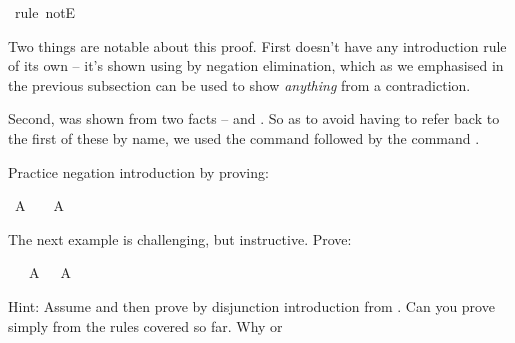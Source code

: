 \begin{isabellebody}
\ {\isacharparenleft}rule\ notE{\isacharparenright}\isanewline
{}\isamarkupfalse%
%
\endisatagproof
{\isafoldproof}%
%
\isadelimproof
%
\endisadelimproof
%
\begin{isamarkuptext}%
Two things are notable about this proof. First  doesn't have any introduction
rule of its own -- it's shown using by negation elimination, which as we emphasised in the previous
subsection can be used to show \emph{anything} from a contradiction.%
\end{isamarkuptext}\isamarkuptrue%
%
\begin{isamarkuptext}%
Second,  was shown from two facts --  and . So as to avoid
having to refer back to the first of these by name, we used the command  followed by
the command .%
\end{isamarkuptext}\isamarkuptrue%
%
\begin{isamarkuptext}%
\begin{Exercise}[label = doublenegationintroduction] 
Practice negation introduction by proving: \end{Exercise}%
\end{isamarkuptext}\isamarkuptrue%
\isamarkupfalse%
\ {\isachardoublequoteopen}A\ {\isasymlongrightarrow}\ {\isasymnot}\ {\isasymnot}\ A{\isachardoublequoteclose}%
\isadelimproof
\ %
\endisadelimproof
%
\isatagproof
{}\isamarkupfalse%
%
\endisatagproof
{\isafoldproof}%
%
\isadelimproof
%
\endisadelimproof
%
\begin{isamarkuptext}%
\begin{Exercise}\label{doubleexcludedmiddle} The next example is challenging, but instructive. Prove: \end{Exercise}%
\end{isamarkuptext}\isamarkuptrue%
\isamarkupfalse%
\ {\isachardoublequoteopen}{\isasymnot}\ {\isasymnot}\ {\isacharparenleft}A\ {\isasymor}\ {\isasymnot}\ A{\isacharparenright}{\isachardoublequoteclose}%
\isadelimproof
\ %
\endisadelimproof
%
\isatagproof
{}\isamarkupfalse%
%
\endisatagproof
{\isafoldproof}%
%
\isadelimproof
%
\endisadelimproof
%
\begin{isamarkuptext}%
Hint: Assume  and then prove  by disjunction introduction
from  . Can you prove simply  from the rules covered so far. Why or 

\end{isamarkuptext}
\end{isabellebody}

